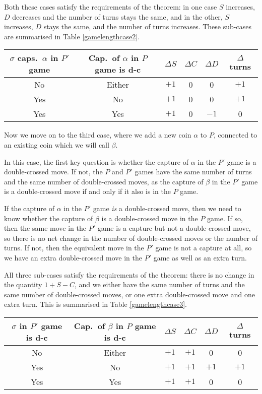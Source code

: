\documentclass[a4paper,twocolumn]{article}
\begin{document}
Both these cases satisfy the requirements of the theorem: in one case
$S$ increases, $D$ decreases and the number of turns stays the same,
and in the other, $S$ increases, $D$ stays the same, and the number of
turns increases. These sub-cases are summarised in Table
\ref{gamelengthcase2}.

\begin{table*}[p]
  \centering
  \begin{tabular}{c c c c c c}
    $\sigma$ caps.\ $\alpha$ in $P'$ game & Cap.\ of $\alpha$
    in $P$ game is d-c & $\Delta S$ & $\Delta C$ & $\Delta D$ &
    $\Delta$ turns \\
    \hline
    No & Either & $+1$ & 0 & 0 & $+1$ \\
    Yes & No & $+1$ & 0 & 0 & $+1$ \\
    Yes & Yes & $+1$ & 0 & $-1$ & 0
  \end{tabular}
  \caption{New string $\sigma$ connecting existing coin $\alpha$ to
    the ground}
  \label{gamelengthcase2}
\end{table*}

Now we move on to the third case, where we add a new coin $\alpha$ to
$P$, connected to an existing coin which we will call $\beta$.

In this case, the first key question is whether the capture of
$\alpha$ in the $P'$ game is a double-crossed move. If not, the $P$
and $P'$ games have the same number of turns and the same number of
double-crossed moves, as the capture of $\beta$ in the $P'$ game is a
double-crossed move if and only if it also is in the $P$ game.

If the capture of $\alpha$ in the $P'$ game \emph{is} a double-crossed
move, then we need to know whether the capture of $\beta$ is a
double-crossed move in the $P$ game. If so, then the same move in the
$P'$ game is a capture but not a double-crossed move, so there is no
net change in the number of double-crossed moves or the number of
turns. If not, then the equivalent move in the $P'$ game is not a
capture at all, so we have an extra double-crossed move in the $P'$
game as well as an extra turn.

All three sub-cases satisfy the requirements of the theorem: there is
no change in the quantity $1+S-C$, and we either have the same number
of turns and the same number of double-crossed moves, or one extra
double-crossed move and one extra turn. This is summarised in Table
\ref{gamelengthcase3}.

\begin{table*}[p]
  \centering
  \begin{tabular}{c c c c c c}
    $\sigma$ in $P'$ game is d-c & Cap.\ of $\beta$ in $P$
    game is d-c & $\Delta S$ & $\Delta C$ & $\Delta D$ & $\Delta$
    turns \\
    \hline
    No & Either & $+1$ & $+1$ & 0 & 0 \\
    Yes & No & $+1$ & $+1$ & $+1$ & $+1$ \\
    Yes & Yes & $+1$ & $+1$ & 0 & 0
  \end{tabular}
  \caption{New coin $\alpha$ connected to existing coin $\beta$ by new
  string $\sigma$}
  \label{gamelengthcase3}
\end{table*}
\end{document}
